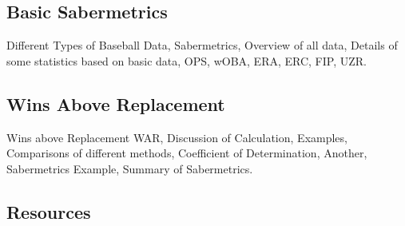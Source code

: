 \subsection{Basic Sabermetrics}\label{basic-sabermetrics}

Different Types of Baseball Data, Sabermetrics, Overview of all data,
Details of some statistics based on basic data, OPS, wOBA, ERA, ERC,
FIP, UZR.





\subsection{Wins Above Replacement}\label{wins-above-replacement}

Wins above Replacement WAR, Discussion of Calculation, Examples,
Comparisons of different methods, Coefficient of Determination, Another,
Sabermetrics Example, Summary of Sabermetrics.






\subsection{Resources}\label{resources}

